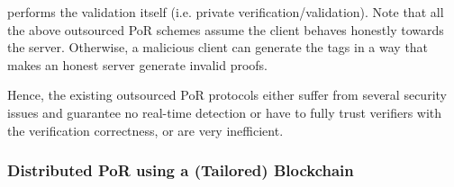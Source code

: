 performs the validation itself (i.e. private verification/validation).  Note that   all the above outsourced PoR schemes \cite{armknecht2014outsourced,xu2016lightweight,Storage-Time}  assume the client behaves honestly towards the server. Otherwise, a malicious client can generate the tags in a way that  makes an honest server generate invalid proofs. 







Hence, the existing outsourced PoR protocols either suffer from several security issues and guarantee no real-time detection or have to fully trust verifiers with the verification correctness, or are very inefficient. 


 \subsubsection{Distributed PoR using a (Tailored) Blockchain}
 
